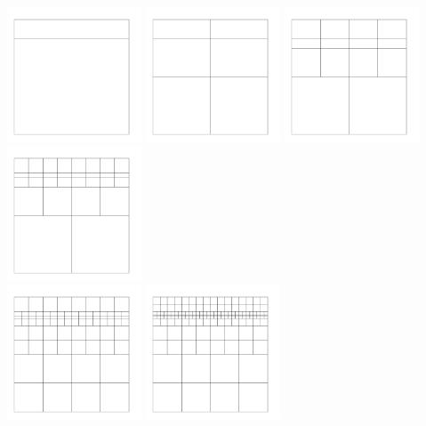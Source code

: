 \noindent
\includegraphics[width=4cm]{images/meshes/AMR/amr_0}
\includegraphics[width=4cm]{images/meshes/AMR/amr_1}
\includegraphics[width=4cm]{images/meshes/AMR/amr_2}
\includegraphics[width=4cm]{images/meshes/AMR/amr_3}\\
\includegraphics[width=4cm]{images/meshes/AMR/amr_4}
\includegraphics[width=4cm]{images/meshes/AMR/amr_5}
